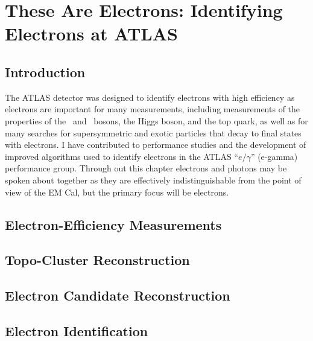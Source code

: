 \chapter[These are Electrons: Identifying Electrons at ATLAS][These Are Electrons: Identifying Electrons at ATLAS]{These Are Electrons: Identifying Electrons at ATLAS}
\label{ch:electronid}

\section{Introduction}
The ATLAS detector was designed to identify electrons with high efficiency as electrons are important for many measurements, including measurements of the properties of the \Wboson\ and \Zboson\ bosons, the Higgs boson, and the top quark, as well as for many searches for supersymmetric and exotic particles that decay to final states with electrons.
I have contributed to performance studies and the development of improved algorithms used to identify electrons in the ATLAS ``$e/\gamma$'' (e-gamma) performance group.
Through out this chapter electrons and photons may be spoken about together as they are effectively indistinguishable from the point of view of the EM Cal, but the primary focus will be electrons. 

\section{Electron-Efficiency Measurements}\label{sec:electroneff}


\section{Topo-Cluster Reconstruction}\label{sec:electroncluster}


\section{Electron Candidate Reconstruction}\label{sec:electronreco}


\section{Electron Identification}\label{sec:electronid}


